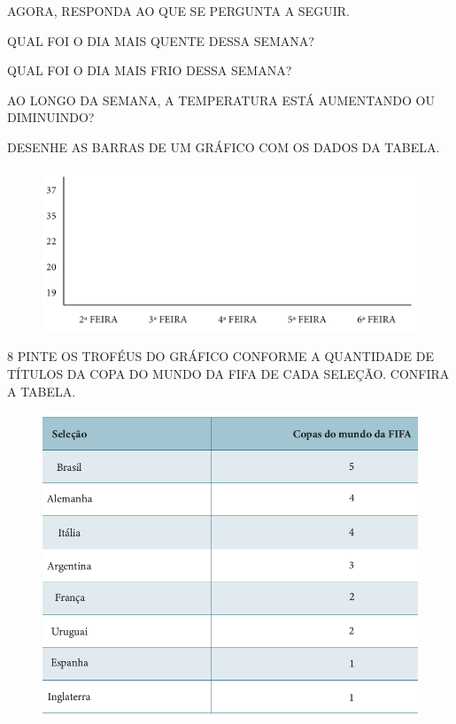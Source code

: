 AGORA, RESPONDA AO QUE SE PERGUNTA A SEGUIR.

\begin{escolha}
\item QUAL FOI O DIA MAIS QUENTE DESSA SEMANA?


\item QUAL FOI O DIA MAIS FRIO DESSA SEMANA?


\item AO LONGO DA SEMANA, A TEMPERATURA ESTÁ AUMENTANDO OU DIMINUINDO?


\item DESENHE AS BARRAS DE UM GRÁFICO COM OS DADOS DA TABELA.

\begin{figure}[htpb!]
\centering
\includegraphics[width=\textwidth]{./media/SAEB_1ANO_MAT_FIGURA106.png}
\end{figure}

\end{escolha}


\num{8} PINTE OS TROFÉUS DO GRÁFICO CONFORME A QUANTIDADE DE TÍTULOS DA COPA DO
MUNDO DA FIFA DE CADA SELEÇÃO. CONFIRA A TABELA.

\begin{figure}[H]
\centering
\includegraphics[width=.8\textwidth]{./media/SAEB_1ANO_MAT_FIGURA107.png}
\end{figure}

